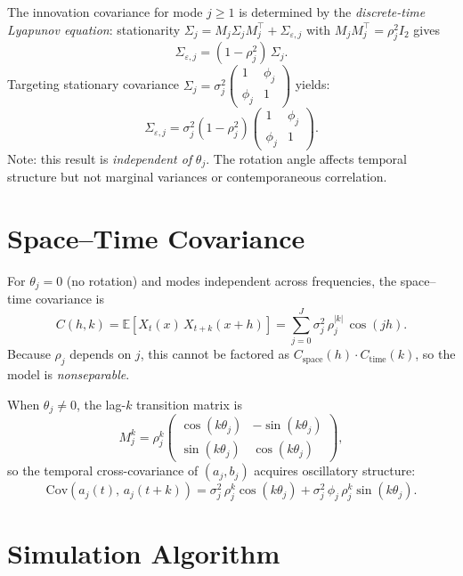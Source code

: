 \documentclass[12pt]{article}
\begin{document}
The innovation covariance for mode $j \geq 1$ is determined by the \emph{discrete-time Lyapunov
equation}: stationarity $\Sigma_j = M_j \Sigma_j M_j^\top + \Sigma_{\varepsilon,j}$ with
$M_j M_j^\top = \rho_j^2 I_2$ gives
\[
  \Sigma_{\varepsilon,j} = (1-\rho_j^2)\,\Sigma_j.
\]
Targeting stationary covariance
$\Sigma_j = \sigma_j^2 \begin{pmatrix} 1 & \phi_j \\ \phi_j & 1 \end{pmatrix}$
yields:
\begin{equation}
  \Sigma_{\varepsilon,j}
  = \sigma_j^2 (1 - \rho_j^2)
    \begin{pmatrix} 1 & \phi_j \\ \phi_j & 1 \end{pmatrix}.
  \label{eq:Sigma-eps}
\end{equation}
Note: this result is \emph{independent of} $\theta_j$. The rotation angle affects temporal
structure but not marginal variances or contemporaneous correlation.

\section{Space--Time Covariance}

For $\theta_j = 0$ (no rotation) and modes independent across frequencies, the space--time
covariance is
\begin{equation}
  C(h, k) = \mathbb{E}[X_t(x)\, X_{t+k}(x+h)]
  = \sum_{j=0}^{J} \sigma_j^2\, \rho_j^{|k|}\, \cos(jh).
  \label{eq:cov-sep}
\end{equation}
Because $\rho_j$ depends on $j$, this cannot be factored as $C_\mathrm{space}(h)\cdot
C_\mathrm{time}(k)$, so the model is \emph{nonseparable}.

When $\theta_j \neq 0$, the lag-$k$ transition matrix is
\[
  M_j^k = \rho_j^k
  \begin{pmatrix} \cos(k\theta_j) & -\sin(k\theta_j) \\ \sin(k\theta_j) & \cos(k\theta_j) \end{pmatrix},
\]
so the temporal cross-covariance of $(a_j, b_j)$ acquires oscillatory structure:
\[
  \mathrm{Cov}(a_j(t),\, a_j(t+k)) = \sigma_j^2\,\rho_j^k\cos(k\theta_j)
  + \sigma_j^2\,\phi_j\,\rho_j^k\sin(k\theta_j).
\]

\section{Simulation Algorithm}
\end{document}
